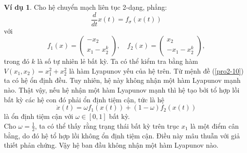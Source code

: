 \documentclass[14pt,a4paper,oneside]{report}		%
\theoremstyle{definition}
\newtheorem{example}[theorem]{Ví dụ}
\begin{document}
\begin{example}
Cho hệ chuyển mạch liên tục 2-dạng, phẳng:
$$\frac{d}{dt}x(t)=f_\sigma(x(t))$$
với
$$
f_1(x)=\begin{pmatrix}
-x_2 \\ x_1 - x_2^k
\end{pmatrix}, \quad f_2(x)=
\begin{pmatrix}
x_2 \\ -x_1-x_2^k
\end{pmatrix},$$
trong đó $k$ là số tự nhiên lẻ bất kỳ. Ta có thể kiểm tra bằng hàm $V(x_1,x_2)=x_1^2+x_2^2$ là hàm Lyapunov yếu của hệ trên. Từ mệnh đề (\ref{pro2-10}) ta có hệ ổn định đều. Tuy nhiên, hệ này không nhận một hàm Lyapunov mạnh nào. Thật vậy, nếu hệ nhận một hàm Lyapunov mạnh thì hệ tạo bởi tổ hợp lồi bất kỳ các hệ con đó phải ổn định tiệm cận, tức là hệ
$$\dot{x}(t)=\omega f_1(x(t))+(1-\omega)f_2(x(t))$$
là ổn định tiệm cận với $\omega\in[0,1]$ bất kỳ.\\
Cho $\omega = \frac{1}{2}$, ta có thể thấy rằng trạng thái bất kỳ trên trục $x_1$ là một điểm cân bằng, do đó hệ tổ hợp lồi không ổn định tiệm cận. Điều này mâu thuẫn với giả thiết phản chứng. Vậy hệ ban đầu không nhận một hàm Lyapunov nào.
\end{example}
\end{document}
